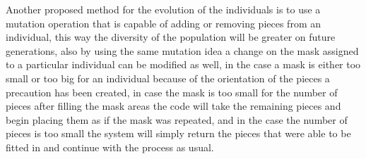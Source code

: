 \documentclass[graybox]{svmult}
\begin{document}
Another proposed method for the evolution of the individuals is to use a mutation operation that is capable of adding or removing pieces from an individual, this way the diversity of the population will be greater on future generations, also by using the same mutation idea a change on the mask assigned to a particular individual can be modified as well, in the case a mask is either too small or too big for an individual because of the orientation of the pieces a precaution has been created, in case the mask is too small for the number of pieces after filling the mask areas the code will take the remaining pieces and begin placing them as if the mask was repeated, and in the case the number of pieces is too small the system will simply return the pieces that were able to be fitted in and continue with the process as usual.




\end{document}
